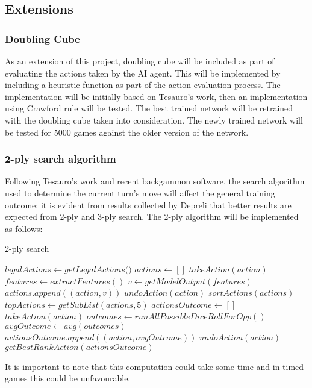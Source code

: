 \documentclass[12pt,a4paper]{article}
\begin{document}
\subsection{Extensions}
\subsubsection{Doubling Cube}
As an extension of this project, doubling cube will be included as part of evaluating the actions taken by the AI agent. This will be implemented by including a heuristic function as part of the action evaluation process. The implementation will be initially based on Tesauro's \citeyear{DBLP:journals/ai/Tesauro02} work, then an implementation using Crawford rule will be tested. The best trained network will be retrained with the doubling cube taken into consideration. The newly trained network will be tested for 5000 games against the older version of the network. 

\subsubsection{2-ply search algorithm}
Following Tesauro's \citeyear{DBLP:journals/ai/Tesauro02} work and recent backgammon software, the search algorithm used to determine the current turn's move will affect the general training outcome; it is evident from results collected by Depreli \citeyear{botbattle} that better results are expected from 2-ply and 3-ply search. The 2-ply algorithm will be implemented as follows:

\begin{algorithm}
    \caption{2-ply search}\label{euclid}
    \begin{algorithmic}[1]
    \State $legalActions \gets \textit{getLegalActions()}$
    \State $actions \gets []$
    \State $\textit{takeAction}(action)$
    \State $features \gets \textit{extractFeatures}()$
    \State $v \gets \textit{getModelOutput}(features)$ 
    \State $actions.\textit{append}((action,v))$
    \State $\textit{undoAction}(action)$
    \EndFor
    \State $\textit{sortActions}(actions)$ 
    \State $topActions \gets \textit{getSubList}(actions, 5)$ 
    \State $actionsOutcome \gets []$
    \State $\textit{takeAction}(action)$
    \State $outcomes \gets \textit{runAllPossibleDiceRollForOpp}()$ 
    \State $avgOutcome \gets \textit{avg}(outcomes)$
    \State $actionsOutcome.\textit{append}((action, avgOutcome))$
    \State $\textit{undoAction}(action)$
    \EndFor
    \Return $\textit{getBestRankAction}(actionsOutcome)$ 
    \end{algorithmic}
\end{algorithm}

It is important to note that this computation could take some time and in timed games this could be unfavourable. 


\end{document}
